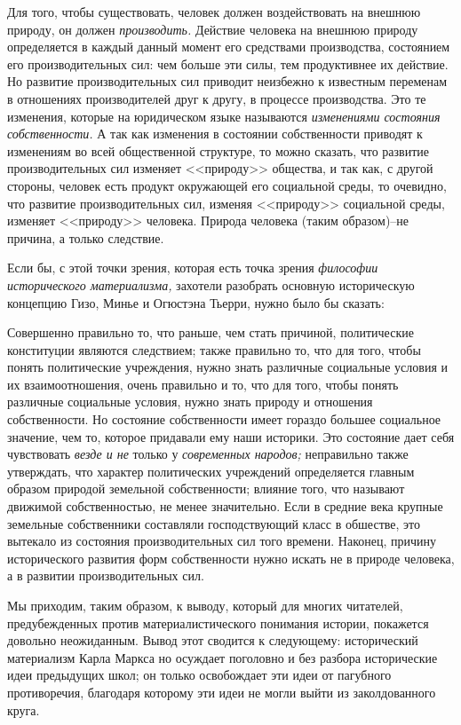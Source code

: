 Для того, чтобы существовать, человек должен воздействовать на внешнюю природу, он должен \emph{производить.} Действие человека на внешнюю природу определяется в каждый данный момент его средствами производства, состоянием его производительных сил: чем больше эти силы, тем продуктивнее их действие. Но развитие производительных сил приводит неизбежно к известным переменам в отношениях производителей друг к другу, в процессе производства. Это те изменения, которые на юридическом языке называются \emph{изменениями состояния собственности.} А так как изменения в состоянии собственности приводят к изменениям во всей общественной структуре, то можно сказать, что развитие производительных сил изменяет <<природу>> общества, и так как, с другой стороны, человек есть продукт окружающей его социальной среды, то очевидно, что развитие производительных сил, изменяя <<природу>> социальной среды, изменяет <<природу>> человека. Природа человека (таким образом)\---не причина, а только следствие.

Если бы, с этой точки зрения, которая есть точка зрения \emph{философии исторического материализма,} захотели разобрать основную историческую концепцию Гизо, Минье и Огюстэна Тьерри, нужно было бы сказать:

Совершенно правильно то, что раньше, чем стать причиной, политические конституции являются следствием; также правильно то, что для того, чтобы понять политические учреждения, нужно знать различные социальные условия и их взаимоотношения, очень правильно и то, что для того, чтобы понять различные социальные условия, нужно знать природу и отношения собственности. Но состояние собственности имеет гораздо большее социальное значение, чем то, которое придавали ему наши историки. Это состояние дает себя чувствовать \emph{везде и не} только у \emph{современных народов;} неправильно также утверждать, что характер политических учреждений определяется главным образом природой земельной собственности; влияние того, что называют движимой собственностью, не менее значительно. Если в средние века крупные земельные собственники составляли господствующий класс в обшестве, это вытекало из состояния производительных сил того времени. Наконец, причину исторического развития форм собственности нужно искать не в природе человека, а в развитии производительных сил.

Мы приходим, таким образом, к выводу, который для многих читателей, предубежденных против материалистического понимания истории, покажется довольно неожиданным. Вывод этот сводится к следующему: исторический материализм Карла Маркса но осуждает поголовно и без разбора исторические идеи предыдущих школ; он только освобождает эти идеи от пагубного противоречия, благодаря которому эти идеи не могли выйти из заколдованного круга.

